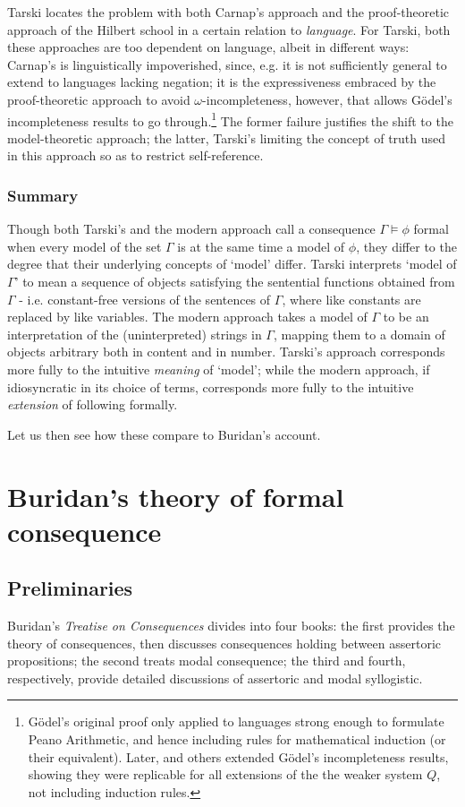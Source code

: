 \documentclass[]{article}
\begin{document}
Tarski locates the problem with both Carnap's approach and the proof-theoretic approach of the Hilbert school in a certain relation to \textit{language}. For Tarski, both these approaches are too dependent on language, albeit in different ways: Carnap's is linguistically impoverished, since, e.g. it is not sufficiently general to extend to languages lacking negation; it is the expressiveness embraced by the proof-theoretic approach to avoid $\omega$-incompleteness, however, that allows G\"{o}del's incompleteness results to go through.\footnote{G\"{o}del's original proof only applied to languages strong enough to formulate Peano Arithmetic, and hence including rules for mathematical induction (or their equivalent). Later, \autocite{Rosser1936} and others extended G\"{o}del's incompleteness results, showing they were replicable for all extensions of the the weaker system $Q$, not including induction rules.} The former failure justifies the shift to the model-theoretic approach; the latter, Tarski's limiting the concept of truth used in this approach so as to restrict self-reference.
\subsubsection{Summary}
Though both Tarski's and the modern approach call a consequence $\Gamma \models \phi$ formal when every model of the set $\Gamma$ is at the same time a model of $\phi$, they differ to the degree that their underlying concepts of `model' differ. Tarski interprets `model of $\Gamma$' to mean a sequence of objects satisfying the sentential functions obtained from $\Gamma$ - i.e. constant-free versions of the sentences of $\Gamma$, where like constants are replaced by like variables. The modern approach takes a model of $\Gamma$ to be an interpretation of the (uninterpreted) strings in $\Gamma$, mapping them to a domain of objects arbitrary both in content and in number. Tarski's approach corresponds more fully to the intuitive \textit{meaning} of `model'; while the modern approach, if idiosyncratic in its choice of terms, corresponds more fully to the intuitive \textit{extension} of following formally. 

Let us then see how these compare to Buridan's account.
\section{Buridan's theory of formal consequence}
\subsection{Preliminaries}
Buridan's \textit{Treatise on Consequences} divides into four books: the first provides the theory of consequences, then discusses consequences holding between assertoric propositions; the second treats modal consequence; the third and fourth, respectively, provide detailed discussions of assertoric and modal syllogistic.
\end{document}
